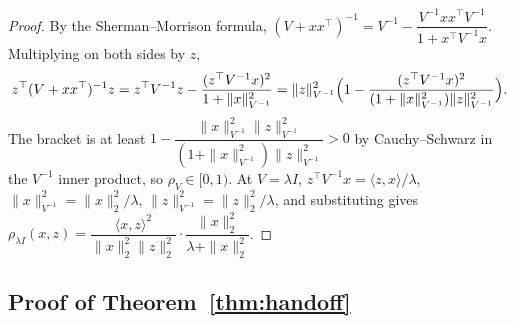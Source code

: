 \documentclass{article}
\theoremstyle{definition}
\theoremstyle{remark}
\theoremstyle{remark}
\begin{document}
\begin{proof}
By the Sherman--Morrison formula,
$(V+xx^\top)^{-1}=V^{-1}-\dfrac{V^{-1}xx^\top V^{-1}}{1+x^\top V^{-1}x}$. Multiplying
on both sides by $z$,
\[
z^\top(V+xx^\top)^{-1}z
= z^\top V^{-1}z-\frac{(z^\top V^{-1}x)^2}{1+\|x\|^2_{V^{-1}}}
=\|z\|^2_{V^{-1}}\Bigl(1-\frac{(z^\top V^{-1}x)^2}{(1+\|x\|^2_{V^{-1}})\|z\|^2_{V^{-1}}}\Bigr).
\]
The bracket is at least $1-\dfrac{\|x\|^2_{V^{-1}}\|z\|^2_{V^{-1}}}{(1+\|x\|^2_{V^{-1}})\|z\|^2_{V^{-1}}}>0$
by Cauchy--Schwarz in the $V^{-1}$ inner product, so $\rho_V\in[0,1)$. At
$V=\lambda I$, $z^\top V^{-1}x=\langle z,x\rangle/\lambda$,
$\|x\|^2_{V^{-1}}=\|x\|_2^2/\lambda$, $\|z\|^2_{V^{-1}}=\|z\|_2^2/\lambda$, and
substituting gives
$\rho_{\lambda I}(x,z)=\dfrac{\langle x,z\rangle^2}{\|x\|_2^2\|z\|_2^2}\cdot\dfrac{\|x\|_2^2}{\lambda+\|x\|_2^2}$.
\end{proof}

\subsection{Proof of Theorem~\ref{thm:handoff}}
\label{app:proof-handoff}
\end{document}
